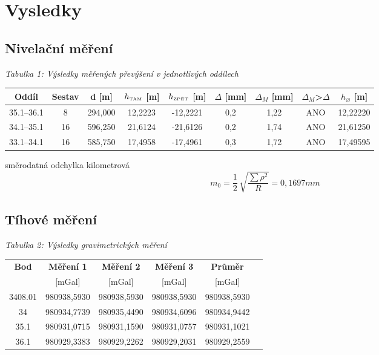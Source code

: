 \section{Vysledky}

\subsection{Nivelační měření}

\begin{table}[H]
    \centering
    \textit{Tabulka 1: Výsledky měřených převýšení v jednotlivých oddílech}
    
    \begin{tabular}{|c|c|c|c|c|c|c|c|c|}
        \hline
        \textbf{Oddíl} & \textbf{Sestav} & d [m] & $h_{\text{\tiny{TAM}}}$ [m] & $h_{\text{\tiny{ZPĚT}}}$ [m] & $\Delta$ [mm] & $\Delta_M$ [mm] & $\Delta_M$>$\Delta$ & $h_{\diameter}$ [m] \\
        \hline \hline
        35.1–36.1 & 8  & 294,000 & 12,2223 & -12,2221 & 0,2 & 1,22 & ANO & 12,22220\\ \hline
        34.1–35.1 & 16 & 596,250 & 21,6124 & -21,6126 & 0,2 & 1,74 & ANO & 21,61250\\ \hline 
        33.1–34.1 & 16 & 585,750 & 17,4958 & -17,4961 & 0,3 & 1,72 & ANO & 17,49595\\ \hline
    \end{tabular}
\end{table}

směrodatná odchylka kilometrová
\[
  m_0 = \frac{1}{2}\,\sqrt{\frac{\sum\rho^2}{R}}= 0,1697 mm
\]

\subsection{Tíhové měření}

\begin{table}[H]
  \centering
  \textit{Tabulka 2: Výsledky gravimetrických měření}
  \begin{tabular}{|c|c|c|c|c|c|}
    \hline
    \textbf{Bod} & \textbf{Měření 1} & \textbf{Měření 2} & \textbf{Měření 3} & \textbf{Průměr} \\
    & {[mGal]} & {[mGal]} & {[mGal]} & {[mGal]} \\ 
    \hline\hline
    3408.01 & 980938,5930 & 980938,5930 & 980938,5930 & 980938,5930 \\ \hline
    34   & 980934,7739 & 980935,4490 & 980934,6096 & 980934,9442 \\ \hline
    35.1 & 980931,0715 & 980931,1590 & 980931,0757 & 980931,1021\\ \hline
    36.1 & 980929,3383 & 980929,2262 & 980929,2031 & 980929,2559\\ \hline
  \end{tabular}
\end{table}

